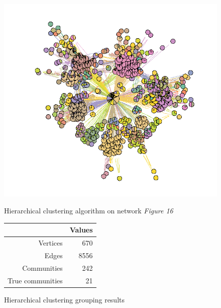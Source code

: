 \documentclass[11pt]{article}       %
\begin{document}
\begin{figure}[H]
\centering
\begin{minipage}[b]{0.47\linewidth}
\vspace{0pt}
\includegraphics[width=\linewidth]{zNetworkHCnotmerged.PNG}
\caption{Hierarchical clustering algorithm on network \textit{Figure 16}}
\end{minipage}
\hspace{0.5cm}
\begin{minipage}[b]{0.45\linewidth}
\captionsetup{type=table}
\centering
\begin{tabular}[b]{rr}
 \hline
 & Values \\ 
  \hline
  Vertices & 670 \\ 
  Edges & 8556 \\
  Communities & 242 \\ 
  True communities & 21 \\ 
   \hline
\end{tabular}
\vspace{2cm}
\caption{Hierarchical clustering grouping results}
\end{minipage}
\end{figure}
\end{document}
